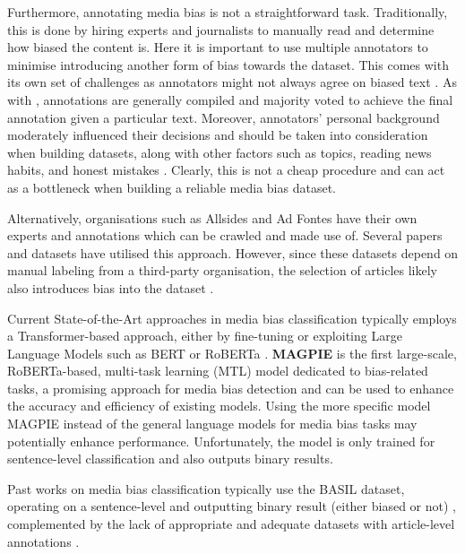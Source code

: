 Furthermore, annotating media bias is not a straightforward task. Traditionally, this is done by hiring experts and journalists to manually read and determine how biased the content is. Here it is important to use multiple annotators to minimise introducing another form of bias towards the dataset. This comes with its own set of challenges as annotators might not always agree on biased text \cite{lim-2018-understanding}. As with \cite{spinde-2021-babe}, annotations are generally compiled and majority voted to achieve the final annotation given a particular text. Moreover, annotators' personal background moderately influenced their decisions and should be taken into consideration when building datasets, along with other factors such as topics, reading news habits, and honest mistakes \cite{spinde-2021-bias-words}. Clearly, this is not a cheap procedure and can act as a bottleneck when building a reliable media bias dataset.

Alternatively, organisations such as Allsides and Ad Fontes have their own experts and annotations which can be crawled and made use of. Several papers and datasets \cite{spinde-2023-bat,chen-2020-nlpcss,kulkarni-2018-multi-view} have utilised this approach. However, since these datasets depend on manual labeling from a third-party organisation, the selection of articles likely also introduces bias into the dataset \cite{spinde-2023-bat}.

Current State-of-the-Art approaches in media bias classification typically employs a Transformer-based approach, either by fine-tuning or exploiting Large Language Models such as BERT \cite{devlin-2019-bert} or RoBERTa \cite{liu-2019-roberta}. \textbf{MAGPIE} \cite{horych-2024-magpie} is the first large-scale, RoBERTa-based, multi-task learning (MTL) model dedicated to bias-related tasks, a promising approach for media bias detection and can be used to enhance the accuracy and efficiency of existing models. Using the more specific model MAGPIE instead of the general language models for media bias tasks may potentially enhance performance. Unfortunately, the model is only trained for sentence-level classification and also outputs binary results.

Past works on media bias classification typically use the BASIL dataset, operating on a sentence-level and outputting binary result (either biased or not) \cite{maab-2023-lexical-bias-detection, maab-2023-target-aware, guo-2022-modeling, van-den-berg-2020-context,lee-2021-unifying,lei-2022-sentence,lei-2024-event-relation}, complemented by the lack of appropriate and adequate datasets with article-level annotations \cite{demidov-2023-political-bias-classification}.

